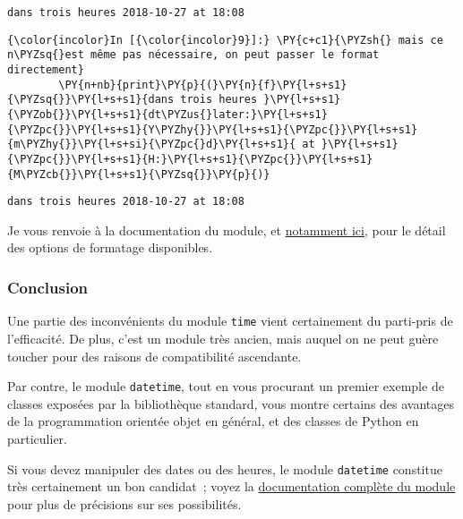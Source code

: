     \begin{Verbatim}[commandchars=\\\{\},frame=single,framerule=0.3mm,rulecolor=\color{cellframecolor}]
dans trois heures 2018-10-27 at 18:08
\end{Verbatim}

    \begin{Verbatim}[commandchars=\\\{\},frame=single,framerule=0.3mm,rulecolor=\color{cellframecolor}]
{\color{incolor}In [{\color{incolor}9}]:} \PY{c+c1}{\PYZsh{} mais ce n\PYZsq{}est même pas nécessaire, on peut passer le format directement}
        \PY{n+nb}{print}\PY{p}{(}\PY{n}{f}\PY{l+s+s1}{\PYZsq{}}\PY{l+s+s1}{dans trois heures }\PY{l+s+s1}{\PYZob{}}\PY{l+s+s1}{dt\PYZus{}later:}\PY{l+s+s1}{\PYZpc{}}\PY{l+s+s1}{Y\PYZhy{}}\PY{l+s+s1}{\PYZpc{}}\PY{l+s+s1}{m\PYZhy{}}\PY{l+s+si}{\PYZpc{}d}\PY{l+s+s1}{ at }\PY{l+s+s1}{\PYZpc{}}\PY{l+s+s1}{H:}\PY{l+s+s1}{\PYZpc{}}\PY{l+s+s1}{M\PYZcb{}}\PY{l+s+s1}{\PYZsq{}}\PY{p}{)}
\end{Verbatim}


    \begin{Verbatim}[commandchars=\\\{\},frame=single,framerule=0.3mm,rulecolor=\color{cellframecolor}]
dans trois heures 2018-10-27 at 18:08
\end{Verbatim}

    Je vous renvoie à la documentation du module, et
\href{https://docs.python.org/3/library/datetime.html\#strftime-and-strptime-behavior}{notamment
ici}, pour le détail des options de formatage disponibles.

    \hypertarget{conclusion}{%
\subsubsection{Conclusion}\label{conclusion}}

    Une partie des inconvénients du module \texttt{time} vient certainement
du parti-pris de l'efficacité. De plus, c'est un module très ancien,
mais auquel on ne peut guère toucher pour des raisons de compatibilité
ascendante.

Par contre, le module \texttt{datetime}, tout en vous procurant un
premier exemple de classes exposées par la bibliothèque standard, vous
montre certains des avantages de la programmation orientée objet en
général, et des classes de Python en particulier.

Si vous devez manipuler des dates ou des heures, le module
\texttt{datetime} constitue très certainement un bon candidat~; voyez la
\href{https://docs.python.org/3/library/datetime.html}{documentation
complète du module} pour plus de précisions sur ses possibilités.


